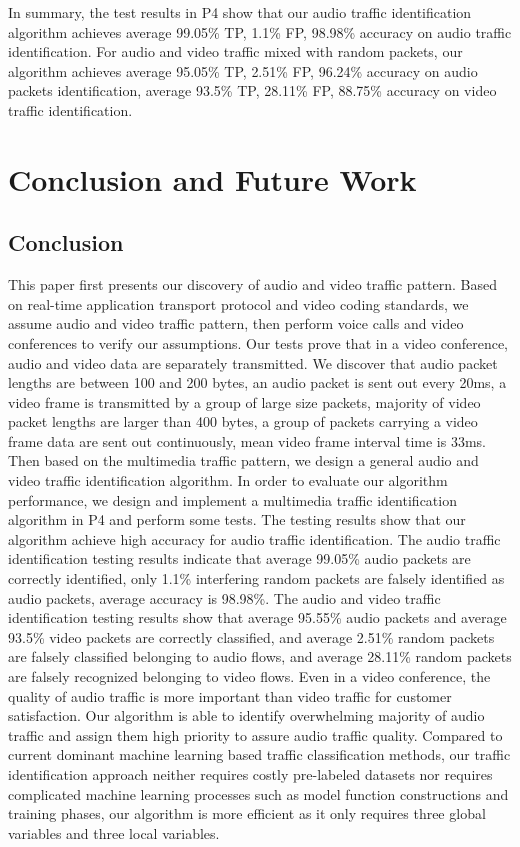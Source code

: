 \documentclass[master]{thesis}
\begin{document}
In summary, the test results in P4 show that our audio traffic identification algorithm achieves average 99.05\% TP, 1.1\% FP, 98.98\% accuracy on audio traffic identification. For audio and video traffic mixed with random packets, our algorithm achieves average 95.05\% TP, 2.51\% FP, 96.24\% accuracy on audio packets identification, average 93.5\% TP, 28.11\% FP, 88.75\% accuracy on video traffic identification. 


\chapter{Conclusion and Future Work}
\label{chap:thesiscls}

\section{Conclusion}

This paper first presents our discovery of audio and video traffic pattern. Based on real-time application transport protocol and video coding standards, we assume audio and video traffic pattern, then perform voice calls and video conferences to verify our assumptions. Our tests prove that in a video conference, audio and video data are separately transmitted.  We discover that audio packet lengths are between 100 and 200 bytes, an audio packet is sent out every 20ms, a video frame is transmitted by a group of large size packets, majority of video packet lengths are larger than 400 bytes, a group of packets carrying a video frame data are sent out continuously, mean video frame interval time is 33ms.  Then based on the multimedia traffic pattern, we design a general audio and video traffic identification algorithm. In order to evaluate our algorithm performance, we design and implement a multimedia traffic identification algorithm in P4 and perform some tests. The testing results show that our algorithm achieve high accuracy for audio traffic identification. The audio traffic identification testing results indicate that average 99.05\% audio packets are correctly identified, only 1.1\% interfering random packets are falsely identified as audio packets, average accuracy is 98.98\%.  The audio and video traffic identification testing results show that average 95.55\% audio packets and average 93.5\% video packets are correctly classified, and average 2.51\% random packets are falsely classified belonging to audio flows, and average 28.11\% random packets are falsely recognized belonging to video flows. Even in a video conference, the quality of audio traffic is more important than video traffic for customer satisfaction. Our algorithm is able to identify overwhelming majority of audio traffic and assign them high priority to assure audio traffic quality. Compared to current dominant machine learning based traffic classification methods, our traffic identification approach neither requires costly pre-labeled datasets nor requires complicated machine learning processes such as model function constructions and training phases, our algorithm is more efficient as it only requires three global variables and three local variables. 
\end{document}
